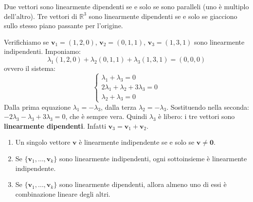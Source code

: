 \begin{notebox}
Due vettori sono linearmente dipendenti se e solo se sono paralleli (uno è multiplo dell'altro). Tre vettori di $\mathbb{R}^3$ sono linearmente dipendenti se e solo se giacciono sullo stesso piano passante per l'origine.
\end{notebox}

\begin{examplebox}
Verifichiamo se $\mathbf{v}_1 = (1, 2, 0)$, $\mathbf{v}_2 = (0, 1, 1)$, $\mathbf{v}_3 = (1, 3, 1)$ sono linearmente indipendenti. Imponiamo:
\[ \lambda_1(1,2,0) + \lambda_2(0,1,1) + \lambda_3(1,3,1) = (0,0,0) \]
ovvero il sistema:
\[
\begin{cases}
\lambda_1 + \lambda_3 = 0 \\
2\lambda_1 + \lambda_2 + 3\lambda_3 = 0 \\
\lambda_2 + \lambda_3 = 0
\end{cases}
\]
Dalla prima equazione $\lambda_1 = -\lambda_3$, dalla terza $\lambda_2 = -\lambda_3$. Sostituendo nella seconda: $-2\lambda_3 - \lambda_3 + 3\lambda_3 = 0$, che è sempre vera. Quindi $\lambda_3$ è libero: i tre vettori sono \textbf{linearmente dipendenti}. Infatti $\mathbf{v}_3 = \mathbf{v}_1 + \mathbf{v}_2$.
\end{examplebox}

\begin{theorembox}
\label{thm:prop-indip}
\begin{enumerate}
    \item Un singolo vettore $\mathbf{v}$ è linearmente indipendente se e solo se $\mathbf{v} \neq \mathbf{0}$.
    \item Se $\{\mathbf{v}_1, \ldots, \mathbf{v}_k\}$ sono linearmente indipendenti, ogni sottoinsieme è linearmente indipendente.
    \item Se $\{\mathbf{v}_1, \ldots, \mathbf{v}_k\}$ sono linearmente dipendenti, allora almeno uno di essi è combinazione lineare degli altri.
\end{enumerate}
\end{theorembox}

